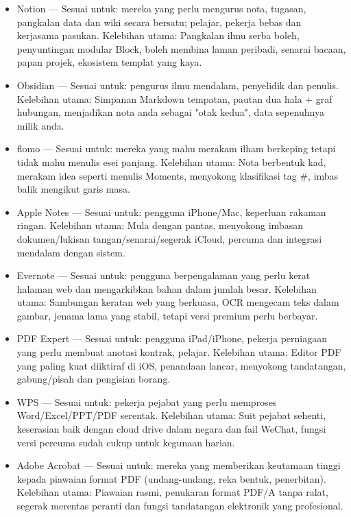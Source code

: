 \begin{itemize}
  \item Notion — Sesuai untuk: mereka yang perlu mengurus nota, tugasan, pangkalan data dan wiki secara bersatu; pelajar, pekerja bebas dan kerjasama pasukan. Kelebihan utama: Pangkalan ilmu serba boleh, penyuntingan modular Block, boleh membina laman peribadi, senarai bacaan, papan projek, ekosistem templat yang kaya.
  \item Obsidian — Sesuai untuk: pengurus ilmu mendalam, penyelidik dan penulis. Kelebihan utama: Simpanan Markdown tempatan, pautan dua hala + graf hubungan, menjadikan nota anda sebagai "otak kedua", data sepenuhnya milik anda.
  \item flomo — Sesuai untuk: mereka yang mahu merakam ilham berkeping tetapi tidak mahu menulis esei panjang. Kelebihan utama: Nota berbentuk kad, merakam idea seperti menulis Moments, menyokong klasifikasi tag \#, imbas balik mengikut garis masa.
  \item Apple Notes — Sesuai untuk: pengguna iPhone/Mac, keperluan rakaman ringan. Kelebihan utama: Mula dengan pantas, menyokong imbasan dokumen/lukisan tangan/senarai/segerak iCloud, percuma dan integrasi mendalam dengan sistem.
  \item Evernote — Sesuai untuk: pengguna berpengalaman yang perlu kerat halaman web dan mengarkibkan bahan dalam jumlah besar. Kelebihan utama: Sambungan keratan web yang berkuasa, OCR mengecam teks dalam gambar, jenama lama yang stabil, tetapi versi premium perlu berbayar.
\end{itemize}


\begin{itemize}
  \item PDF Expert — Sesuai untuk: pengguna iPad/iPhone, pekerja perniagaan yang perlu membuat anotasi kontrak, pelajar. Kelebihan utama: Editor PDF yang paling kuat diiktiraf di iOS, penandaan lancar, menyokong tandatangan, gabung/pisah dan pengisian borang.
  \item WPS — Sesuai untuk: pekerja pejabat yang perlu memproses Word/Excel/PPT/PDF serentak. Kelebihan utama: Suit pejabat sehenti, keserasian baik dengan cloud drive dalam negara dan fail WeChat, fungsi versi percuma sudah cukup untuk kegunaan harian.
  \item Adobe Acrobat — Sesuai untuk: mereka yang memberikan keutamaan tinggi kepada piawaian format PDF (undang-undang, reka bentuk, penerbitan). Kelebihan utama: Piawaian rasmi, penukaran format PDF/A tanpa ralat, segerak merentas peranti dan fungsi tandatangan elektronik yang profesional.
\end{itemize}

